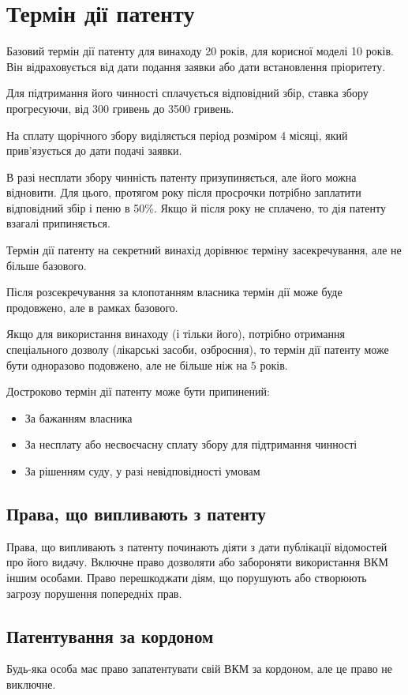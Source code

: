 \section{Термін дії патенту}
Базовий термін дії патенту для винаходу 20 років, для корисної моделі 10 років. Він відраховується від дати подання заявки або дати встановлення пріоритету.

Для підтримання його чинності сплачується відповідний збір, ставка збору прогресуючи, від 300 гривень до 3500 гривень.

На сплату щорічного збору виділяється період розміром 4 місяці, який прив’язується до дати подачі заявки. 

В разі несплати збору чинність патенту призупиняється, але його можна відновити. Для цього, протягом року після просрочки потрібно заплатити відповідний збір і пеню в 50\%. Якщо й після року не сплачено, то дія патенту взагалі припиняється.

Термін дії патенту на секретний винахід дорівнює терміну засекречування, але не більше базового.

Після розсекречування за клопотанням власника термін дії може буде продовжено, але в рамках базового.	

Якщо для використання винаходу (і тільки його), потрібно отримання спеціального дозволу (лікарські засоби, озброєння), то термін дії патенту може бути одноразово подовжено, але не більше ніж на 5 років.

Достроково термін дії патенту може бути припинений:
\begin{itemize}
	\item За бажанням власника
	\item За несплату або несвоєчасну сплату збору для підтримання чинності
	\item За рішенням суду, у разі невідповідності умовам
\end{itemize}

\subsection{Права, що випливають з патенту}
Права, що випливають з патенту починають діяти з дати публікації відомостей про його видачу.
Включне право дозволяти або забороняти використання ВКМ іншим особами.
Право перешкоджати діям, що порушують або створюють загрозу порушення попередніх прав.
	
\subsection{Патентування за кордоном}
Будь-яка особа має право запатентувати свій ВКМ за кордоном, але це право не виключне.

